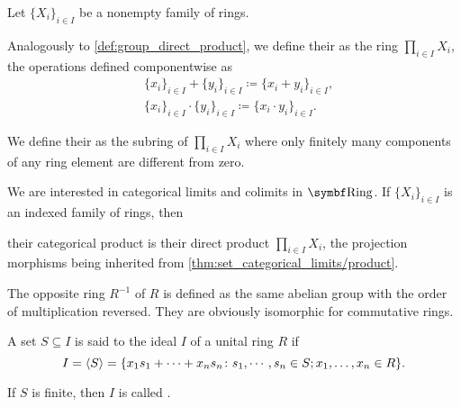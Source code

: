 \begin{definition}\label{def:semiring_direct_product}
  Let \( \{ X_i \}_{i \in I} \) be a nonempty family of rings.

  Analogously to \cref{def:group_direct_product}, we define their  as the ring \( \prod_{i \in I} X_i \), the operations defined componentwise as
  \begin{align*}
    &\{ x_i \}_{i \in I} + \{ y_i \}_{i \in I}
    \coloneqq
    \{ x_i + y_i \}_{i \in I}, \\
    &\{ x_i \}_{i \in I} \cdot \{ y_i \}_{i \in I}
    \coloneqq
    \{ x_i \cdot y_i \}_{i \in I}.
  \end{align*}

  We define their  as the subring of \( \prod_{i \in I} X_i \) where only finitely many components of any ring element are different from zero.
\end{definition}

\begin{proposition}\label{thm:ring_categorical_limits}
  We are interested in categorical limits and colimits in \( \Cat{Ring} \). If \( \{ X_i \}_{i \in I} \) is an indexed family of rings, then
  \begin{defenum}
     their categorical product is their direct product \( \prod_{i \in I} X_i \), the projection morphisms being inherited from \cref{thm:set_categorical_limits/product}.
  \end{defenum}
\end{proposition}

\begin{definition}\label{def:opposite_ring}\cite[555]{Knapp2016BAlg}
  The opposite ring \( R^{-1} \) of \( R \) is defined as the same abelian group with the order of multiplication reversed. They are obviously isomorphic for commutative rings.
\end{definition}

\begin{definition}\label{def:ideal_generators}\cite[176]{Knapp2016BAlg}
  A set \( S \subseteq I \) is said to  the ideal \( I \) of a unital ring \( R \) if
  \begin{equation*}
    I = \left\langle  S  \right\rangle = \{ x_1 s_1 + \cdots + x_n s_n \colon s_1, \cdots, s_n \in S; x_1, \ldots, x_n \in R \}.
  \end{equation*}

  If \( S \) is finite, then \( I \) is called .
\end{definition}

